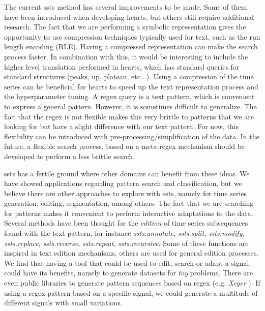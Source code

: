 The current \gls{ssts} method has several improvements to be made. Some of them have been introduced when developing \gls{hearts}, but others still require additional research. The fact that we are performing a symbolic representation gives the opportunity to use compression techniques typically used for text, such as the run length encoding (RLE). Having a compressed representation can make the search process faster. In combination with this, it would be interesting to include the higher level translation performed in \gls{hearts}, which has standard queries for standard structures (peaks, up, plateau, etc...). Using a compression of the time series can be beneficial for \gls{hearts} to speed up the text representation process and the hyperparameter tuning.
A \gls{regex} query is a text pattern, which is convenient to express a general pattern. However, it is sometimes difficult to generalize. The fact that the \gls{regex} is not flexible makes this very brittle to patterns that we are looking for but have a slight difference with our text pattern. For now, this flexibility can be introduced with pre-processing/simplification of the data. In the future, a flexible search process, based on a meta-regex mechanism should be developed to perform a less brittle search.
\par
\gls{ssts} has a fertile ground where other domains can benefit from these ideas. We have showed applications regarding pattern search and classification, but we believe there are other approaches to explore with \gls{ssts}, namely for time series generation, editing, segmentation, among others. The fact that we are searching for patterns makes it convenient to perform interactive adaptations to the data. Several methods have been thought for the \textit{edition} of time series subsequences found with the text pattern, for instance \textit{ssts.annotate}, \textit{ssts.split}, \textit{ssts.modify}, \textit{ssts.replace}, \textit{ssts.reverse}, \textit{ssts.repeat}, \textit{ssts.recursive}. Some of these functions are inspired in text edition mechanisms, others are used for general edition processes. We find that having a tool that could be used to edit, search or adapt a signal could have its benefits, namely to generate datasets for \textit{toy} problems. There are even public libraries to generate pattern sequences based on \gls{regex} (e.g. \textit{Xeger} \cite{xeger}). If using a \gls{regex} pattern based on a specific signal, we could generate a multitude of different signals with small variations.
\par
